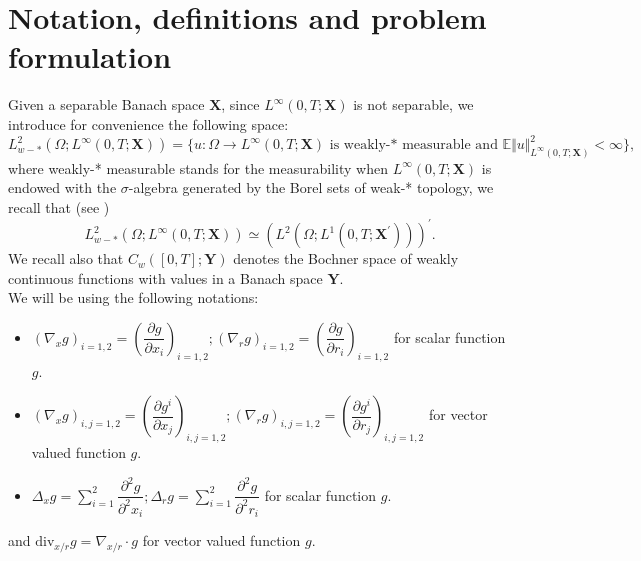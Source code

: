 \documentclass[a4paper,12pt, reqno]{amsart}
\newcommand{\E}{\ensuremath{\mathbb{E}}}
\newcommand{\Div}{\text{div}}
\begin{document}
\section{Notation, definitions and problem formulation}\label{Section1-desciption}
Given a separable Banach space $\mathbf{X}$, since $L^{\infty}(0,T;\mathbf{X})$	is	not	separable,	
we	introduce for convenience	the	following	space:
$$L^2_{w-*}(\Omega;L^\infty(0,T;\mathbf{X}))=\{ 	u:\Omega\to	L^\infty(0,T;\mathbf{X})	\text{	is	 weakly-* measurable		and	}	\E\Vert	u\Vert_{L^\infty(0,T;\mathbf{X})}^2<\infty\},$$
where	weakly-* measurable	stands	for	the	measurability	when	$L^\infty(0,T;\mathbf{X})$	is	endowed	with	the	$\sigma$-algebra	generated	by	the	Borel	sets	of	weak-*	topology, we recall that (see 	\cite[Thm. 8.20.3]{Edwards}) $$ L^2_{w-*}(\Omega ;L^\infty(0, T;\mathbf{X}))\simeq \left(L^2(\Omega ;L^1(0, T;\mathbf{X}^\prime)) \right)^\prime .$$	
We recall also that  $C_w([0, T];\mathbf{Y})$    denotes 	the	Bochner space of weakly continuous functions with values in a Banach space $\mathbf{Y}.$\\
We will be using the following notations:
\begin{itemize}
	\item   $(\nabla_x  g)_{i=1,2}=(\dfrac{\partial g}{\partial  x_i})_{i=1,2}; (\nabla_r  g)_{i=1,2}=(\dfrac{\partial g}{\partial  r_i})_{i=1,2} $ for scalar   function    $g$.
	\item   $(\nabla_x  g)_{i,j=1,2}=(\dfrac{\partial g^i}{\partial  x_j})_{i,j=1,2}; (\nabla_r  g)_{i,j=1,2}=(\dfrac{\partial g^i}{\partial  r_j})_{i,j=1,2} $ for vector  valued   function   $g$.
	\item     $\Delta_xg=\displaystyle\sum_{i=1}^2\dfrac{\partial^2 g}{\partial^2  x_i};  \Delta_rg=\displaystyle\sum_{i=1}^2\dfrac{\partial^2 g}{\partial^2  r_i}$  for scalar   function    $g$.   
\end{itemize}
and     $\Div_{x/r}   g=\nabla_{x/r}    \cdot   g$  for vector  valued   function   $g$.
\end{document}
